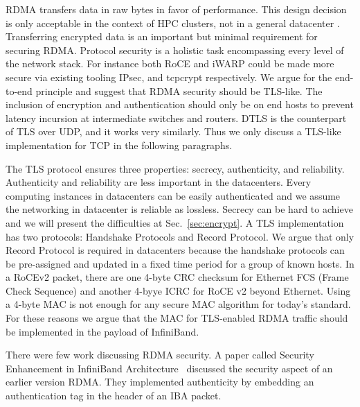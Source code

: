 RDMA transfers data in raw bytes in favor of performance. This design decision
is only acceptable in the context of HPC clusters, not in a general datacenter .
Transferring encrypted data is an important but minimal requirement for securing
RDMA.  Protocol security is a holistic task encompassing every level of the
network stack. For instance both RoCE and iWARP could be made more secure via
existing tooling IPsec, and tcpcrypt respectively.  We argue for the end-to-end
principle and suggest that RDMA security should be TLS-like.  The inclusion of
encryption and authentication should only be on end hosts to prevent latency
incursion at intermediate switches and routers. DTLS is the counterpart of TLS
over UDP, and it works very similarly. Thus we only discuss a TLS-like
implementation for TCP in the following paragraphs.

The TLS protocol ensures three properties: secrecy, authenticity, and
reliability. Authenticity and reliability are less important in the datacenters.
Every computing instances in datacenters can be easily authenticated and we
assume the networking in datacenter is reliable as lossless. Secrecy can be hard
to achieve and we will present the difficulties at Sec.~\ref{sec:encrypt}. A TLS
implementation has two protocols: Handshake Protocols and Record Protocol. We
argue that only Record Protocol is required in datacenters because the handshake
protocols can be pre-assigned and updated in a fixed time period for a group of
known hosts. In a RoCEv2 packet, there are one 4-byte CRC checksum for Ethernet
FCS (Frame Check Sequence) and another 4-byye ICRC for RoCE v2 beyond Ethernet.
Using a 4-byte MAC is not enough for any secure MAC algorithm for today's
standard. For these reasons we argue that the MAC for TLS-enabled RDMA traffic
should be implemented in the payload of InfiniBand.

There were few work discussing RDMA security. A paper called Security Enhancement in InfiniBand
Architecture~\cite{Lee:2005:SEI:1053727.1054449} discussed the security aspect of an earlier version RDMA.  
They implemented authenticity by embedding an authentication tag in the header of an IBA packet.
